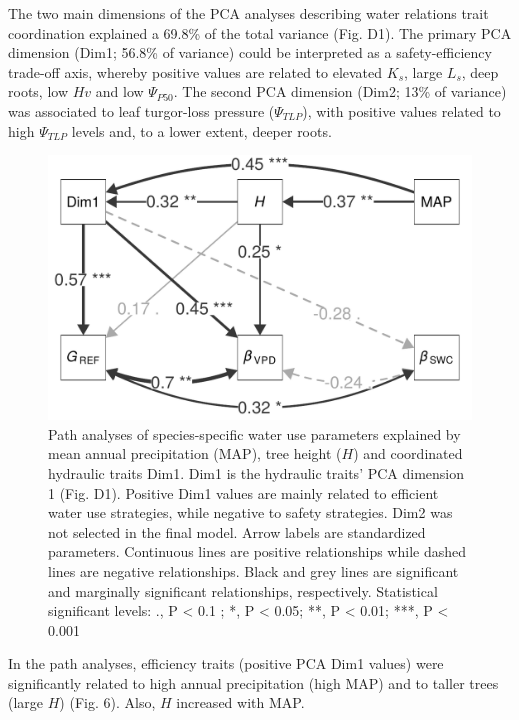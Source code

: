 \documentclass[11pt,twoside]{reedthesis}
\begin{document}
The two main dimensions of the PCA analyses describing water relations
trait coordination explained a 69.8\% of the total variance (Fig. D1).
The primary PCA dimension (Dim1; 56.8\% of variance) could be
interpreted as a safety-efficiency trade-off axis, whereby positive
values are related to elevated \(K_s\), large \(L_s\), deep roots, low
\(Hv\) and low \textbar{}\(\Psi_{P50}\)\textbar{}. The second PCA
dimension (Dim2; 13\% of variance) was associated to leaf turgor-loss
pressure (\(\Psi_{TLP}\)), with positive values related to high
\textbar{}\(\Psi_{TLP}\)\textbar{} levels and, to a lower extent, deeper
roots.\par
\begin{figure}[hbt!]

{\centering \includegraphics[width=0.8\linewidth]{figure/CH5/Figure_6} 

}

\caption[Path analyses of species-specific water use parameters.]{Path analyses of species-specific water use parameters explained by mean annual precipitation (MAP), tree height ($H$) and coordinated hydraulic traits Dim1. Dim1 is the hydraulic traits’ PCA dimension 1 (Fig. D1). Positive Dim1 values are mainly related to efficient water use strategies, while negative to safety strategies. Dim2 was not selected in the final model. Arrow labels are standardized parameters. Continuous lines are positive relationships while dashed lines are negative relationships. Black and grey lines are significant and marginally significant relationships, respectively. Statistical significant levels: ., P < 0.1 ; *, P < 0.05; **, P < 0.01; ***, P < 0.001}\label{fig:ch5fig6}
\end{figure}
In the path analyses, efficiency traits (positive PCA Dim1 values) were
significantly related to high annual precipitation (high MAP) and to
taller trees (large \(H\)) (Fig. 6). Also, \(H\) increased with MAP.
\end{document}
